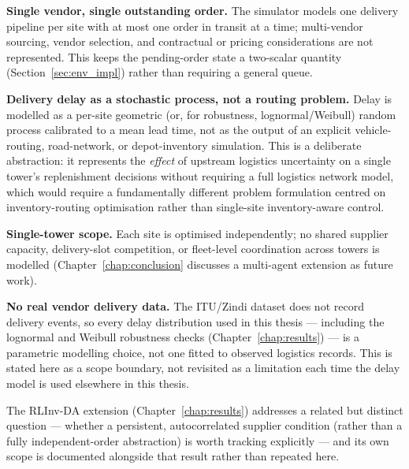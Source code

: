 \textbf{Single vendor, single outstanding order.} The simulator models
one delivery pipeline per site with at most one order in transit at a
time; multi-vendor sourcing, vendor selection, and contractual or
pricing considerations are not represented. This keeps the pending-order
state a two-scalar quantity (Section~\ref{sec:env_impl}) rather than
requiring a general queue.

\textbf{Delivery delay as a stochastic process, not a routing problem.}
Delay is modelled as a per-site geometric (or, for robustness,
lognormal/Weibull) random process calibrated to a mean lead time, not as
the output of an explicit vehicle-routing, road-network, or
depot-inventory simulation. This is a deliberate abstraction: it
represents the \emph{effect} of upstream logistics uncertainty on a
single tower's replenishment decisions without requiring a full
logistics network model, which would require a fundamentally different
problem formulation centred on inventory-routing optimisation rather
than single-site inventory-aware control.

\textbf{Single-tower scope.} Each site is optimised independently; no
shared supplier capacity, delivery-slot competition, or fleet-level
coordination across towers is modelled (Chapter~\ref{chap:conclusion}
discusses a multi-agent extension as future work).

\textbf{No real vendor delivery data.} The ITU/Zindi dataset does not
record delivery events, so every delay distribution used in this thesis
--- including the lognormal and Weibull robustness checks
(Chapter~\ref{chap:results}) --- is a parametric modelling choice, not
one fitted to observed logistics records. This is stated here as a
scope boundary, not revisited as a limitation each time the delay model
is used elsewhere in this thesis.

The RLInv-DA extension (Chapter~\ref{chap:results}) addresses a related
but distinct question --- whether a persistent, autocorrelated supplier
condition (rather than a fully independent-order abstraction) is
worth tracking explicitly --- and its own scope is documented alongside
that result rather than repeated here.